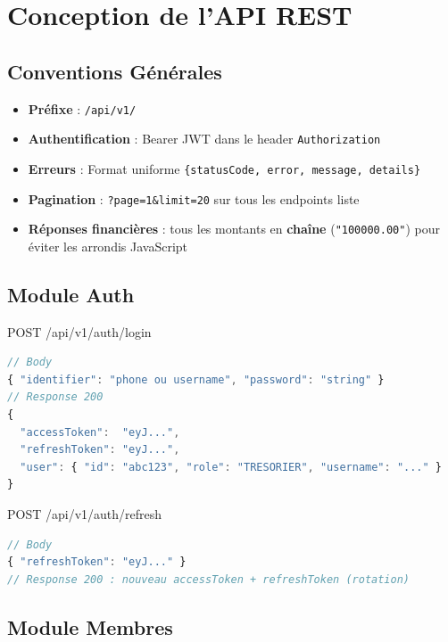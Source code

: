 \documentclass[12pt, a4paper]{report}
\begin{document}
\chapter{Conception de l'API REST}

\section{Conventions Générales}

\begin{itemize}
  \item \textbf{Préfixe} : \texttt{/api/v1/}
  \item \textbf{Authentification} : Bearer JWT dans le header \texttt{Authorization}
  \item \textbf{Erreurs} : Format uniforme \texttt{\{statusCode, error, message, details\}}
  \item \textbf{Pagination} : \texttt{?page=1\&limit=20} sur tous les endpoints liste
  \item \textbf{Réponses financières} : tous les montants en \textbf{chaîne} (\texttt{"100000.00"}) pour éviter
        les arrondis JavaScript
\end{itemize}

\section{Module Auth}

\begin{apiBox}{POST /api/v1/auth/login}
\begin{lstlisting}[language=TypeScript, numbers=none]
// Body
{ "identifier": "phone ou username", "password": "string" }
// Response 200
{
  "accessToken":  "eyJ...",
  "refreshToken": "eyJ...",
  "user": { "id": "abc123", "role": "TRESORIER", "username": "..." }
}
\end{lstlisting}
\end{apiBox}

\begin{apiBox}{POST /api/v1/auth/refresh}
\begin{lstlisting}[language=TypeScript, numbers=none]
// Body
{ "refreshToken": "eyJ..." }
// Response 200 : nouveau accessToken + refreshToken (rotation)
\end{lstlisting}
\end{apiBox}

\section{Module Membres}
\end{document}
